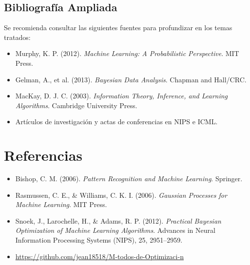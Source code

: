 \documentclass[12pt]{article}
\begin{document}
	\subsection{Bibliografía Ampliada}
	Se recomienda consultar las siguientes fuentes para profundizar en los temas tratados:
	\begin{itemize}[leftmargin=1.5cm]
		\item Murphy, K. P. (2012). \textit{Machine Learning: A Probabilistic Perspective}. MIT Press.
		\item Gelman, A., et al. (2013). \textit{Bayesian Data Analysis}. Chapman and Hall/CRC.
		\item MacKay, D. J. C. (2003). \textit{Information Theory, Inference, and Learning Algorithms}. Cambridge University Press.
		\item Artículos de investigación y actas de conferencias en NIPS e ICML.
	\end{itemize}
	\section*{Referencias}
	\begin{itemize}[leftmargin=1.5cm]
		\item Bishop, C. M. (2006). \textit{Pattern Recognition and Machine Learning}. Springer.
		\item Rasmussen, C. E., \& Williams, C. K. I. (2006). \textit{Gaussian Processes for Machine Learning}. MIT Press.
		\item Snoek, J., Larochelle, H., \& Adams, R. P. (2012). \textit{Practical Bayesian Optimization of Machine Learning Algorithms}. Advances in Neural Information Processing Systems (NIPS), 25, 2951–2959.
		\item \url{https://github.com/jean18518/M-todos-de-Optimizaci-n}
	\end{itemize}
	
\end{document}
